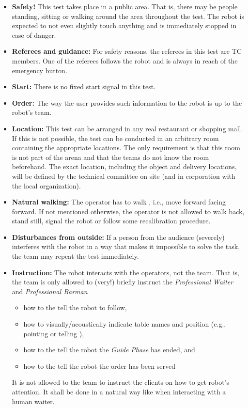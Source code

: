 \begin{itemize}
	\item \textbf{Safety!} This test takes place in a public area. That is, there may be people standing, sitting or walking around the area throughout the test. The robot is expected to not even slightly touch anything and is immediately stopped in case of danger.

	\item \textbf{Referees and guidance:} For safety reasons, the referees in this test are TC members. One of the referees follows the robot and is always in reach of the emergency button.

	\item \textbf{Start:} There is no fixed start signal in this test.

	\item \textbf{Order:} The way the user provides such information to the robot is up to the robot's team.

	\item \textbf{Location:} This test can be arranged in any real restaurant or shopping mall. If this is not possible, the test can be conducted in an arbitrary room containing the appropriate locations. The only requirement is that this room is not part of the arena and that the teams do not know the room beforehand. The exact location, including the object and delivery locations, will be defined by the technical committee on site (and in corporation with the local organization).

	\item \textbf{Natural walking:} The operator has to walk , i.e., move forward facing forward. If not mentioned otherwise, the operator is not allowed to walk back, stand still, signal the robot or follow some recalibration procedure.

	\item \textbf{Disturbances from outside:} If a person from the audience (severely) interferes with the robot in a way that makes it impossible to solve the task, the team may repeat the test immediately.

	\item \textbf{Instruction:} The robot interacts with the operators, not the team. That is, the team is only allowed to (very!) briefly instruct the \textit{Professional Waiter} and \textit{Professional Barman} 
	\begin{itemize}
		\item how to the tell the robot to follow,
		\item how to visually/acoustically indicate table names and position (e.g., pointing or telling ), 
		\item how to the tell the robot the \textit{Guide Phase} has ended, and
		\item how to the tell the robot the order has been served
	\end{itemize}
	It is not allowed to the team to instruct the clients on how to get robot's attention. It shall be done in a natural way like when interacting with a human waiter.


\end{itemize}

